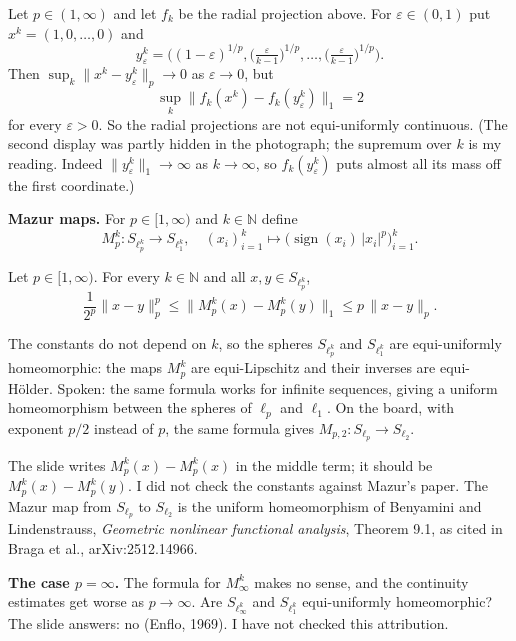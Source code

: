 \begin{exercise}
\label{exercise-radial-projection-not-equi}
Let $p \in (1,\infty)$ and let $f_k$ be the
radial projection above. For
$\varepsilon \in (0,1)$ put
$x^k = (1,0,\ldots,0)$ and
$$
y^k_\varepsilon
= \Big((1-\varepsilon)^{1/p},
\big(\tfrac{\varepsilon}{k-1}\big)^{1/p},
\ldots,
\big(\tfrac{\varepsilon}{k-1}\big)^{1/p}
\Big).
$$
Then
$\sup_k \|x^k - y^k_\varepsilon\|_p \to 0$ as
$\varepsilon \to 0$, but
$$
\sup_k \|f_k(x^k) - f_k(y^k_\varepsilon)\|_1
= 2
$$
for every $\varepsilon > 0$. So the radial
projections are not equi-uniformly
continuous. (The second display was partly
hidden in the photograph; the supremum over
$k$ is my reading. Indeed
$\|y^k_\varepsilon\|_1 \to \infty$ as
$k \to \infty$, so $f_k(y^k_\varepsilon)$
puts almost all its mass off the first
coordinate.)
\end{exercise}

\medskip\noindent
{\bf Mazur maps.} For $p \in [1,\infty)$ and
$k \in \mathbb{N}$ define
$$
M_p^k : S_{\ell_p^k} \to S_{\ell_1^k},
\quad
(x_i)_{i=1}^k \mapsto
\big(\operatorname{sign}(x_i)\,
|x_i|^p\big)_{i=1}^k.
$$

\begin{theorem}[Mazur, 1929]
\label{theorem-mazur-maps}
Let $p \in [1,\infty)$. For every
$k \in \mathbb{N}$ and all
$x,y \in S_{\ell_p^k}$,
$$
\frac{1}{2^p}\|x - y\|_p^p
\le \|M_p^k(x) - M_p^k(y)\|_1
\le p\,\|x - y\|_p.
$$
\end{theorem}

\noindent
The constants do not depend on $k$, so the
spheres $S_{\ell_p^k}$ and $S_{\ell_1^k}$ are
equi-uniformly homeomorphic: the maps
$M_p^k$ are equi-Lipschitz and their inverses
are equi-H\"older. Spoken: the same formula
works for infinite sequences, giving a
uniform homeomorphism between the spheres of
$\ell_p$ and $\ell_1$. On the board, with
exponent $p/2$ instead of $p$, the same
formula gives
$M_{p,2} : S_{\ell_p} \to S_{\ell_2}$.

\begin{remark}
\label{remark-mazur-slide-typo}
The slide writes $M_p^k(x) - M_p^k(x)$ in the
middle term; it should be
$M_p^k(x) - M_p^k(y)$. I did not check the
constants against Mazur's paper. The Mazur
map from $S_{\ell_p}$ to $S_{\ell_2}$ is the
uniform homeomorphism of Benyamini and
Lindenstrauss, \emph{Geometric nonlinear
functional analysis}, Theorem 9.1, as cited
in Braga et al., arXiv:2512.14966.
\end{remark}

\medskip\noindent
{\bf The case $p = \infty$.} The formula for
$M_\infty^k$ makes no sense, and the
continuity estimates get worse as
$p \to \infty$. Are $S_{\ell_\infty^k}$ and
$S_{\ell_1^k}$ equi-uniformly homeomorphic?
The slide answers: no (Enflo, 1969). I have
not checked this attribution.

